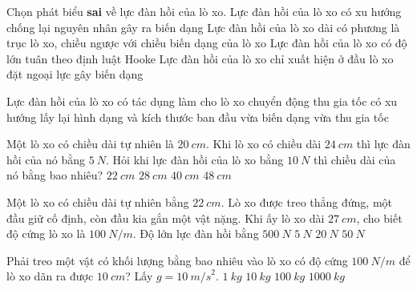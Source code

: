 \begin{ex}
Chọn phát biểu \textbf{sai} về lực đàn hồi của lò xo.	
	\choice
	{Lực đàn hồi của lò xo có xu hướng chống lại nguyên nhân gây ra biến dạng}
	{Lực đàn hồi của lò xo dài có phương là trục lò xo, chiều ngược với chiều biến dạng của lò xo}
	{Lực đàn hồi của lò xo có độ lớn tuân theo định luật Hooke}
	{\True Lực đàn hồi của lò xo chỉ xuất hiện ở đầu lò xo đặt ngoại lực gây biến dạng}
\end{ex}
\begin{ex}
Lực đàn hồi của lò xo có tác dụng làm cho lò xo	
	\choice
	{chuyển động}
	{thu gia tốc}
	{\True có xu hướng lấy lại hình dạng và kích thước ban đầu}
	{vừa biến dạng vừa thu gia tốc}
	\loigiai{}
\end{ex}
\begin{ex}
	Một lò xo có chiều dài tự nhiên là $\SI{20}{cm}$. Khi lò xo có chiều dài $\SI{24}{cm}$ thì lực đàn hồi của nó bằng $\SI{5}{N}$. Hỏi khi lực đàn hồi của lò xo bằng $\SI{10}{N}$ thì chiều dài của nó bằng bao nhiêu?
	\choice
	{$\SI{22}{cm}$}
	{\True $\SI{28}{cm}$}
	{$\SI{40}{cm}$}
	{$\SI{48}{cm}$}
\end{ex}
\begin{ex}
	Một lò xo có chiều dài tự nhiên bằng $\SI{22}{cm}$. Lò xo được treo thẳng đứng, một đầu giữ cố định, còn đầu kia gắn một vật nặng. Khi ấy lò xo dài $\SI{27}{cm}$, cho biết độ cứng lò xo là $\SI{100}{N/m}$. Độ lớn lực đàn hồi bằng 	
	\choice
	{$\SI{500}{N}$}
	{\True $\SI{5}{N}$}
	{$\SI{20}{N}$}
	{$\SI{50}{N}$}
\end{ex}
\begin{ex}
	Phải treo một vật có khối lượng bằng bao nhiêu vào lò xo có độ cứng $\SI{100}{N/m}$ để lò xo dãn ra được $\SI{10}{cm}$? Lấy $g = \SI{10}{m/s}^2$.
	\choice
	{\True $\SI{1}{kg}$}
	{$\SI{10}{kg}$}
	{$\SI{100}{kg}$}
	{$\SI{1000}{kg}$}
\end{ex}
	
